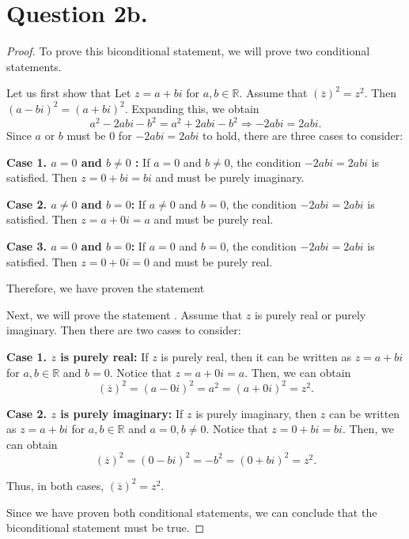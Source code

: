 \documentclass{article}
\begin{document}
\section*{Question 2b.}
\begin{proof}
    To prove this biconditional statement, we will prove two conditional statements.

    \noindent Let us first show that  Let $ z = a + bi $ for $ a, b \in \mathbb{R} $. Assume that $ (\overline{z})^2 = z^2 $. Then $ (a - bi)^2 = (a + bi)^2 $. Expanding this, we obtain
    \[
        a^2 - 2abi - b^2 = a^2 + 2abi - b^2 \Rightarrow -2abi = 2abi.
    \]
    Since $ a $ or $ b $ must be $ 0 $ for $ -2abi = 2abi $ to hold, there are three cases to consider:

    \noindent \textbf{Case 1. $ a = 0 $ and $ b \neq 0 $ :} If $ a = 0 $ and $ b \neq 0 $, the condition $ -2abi = 2abi $ is satisfied. Then $ z = 0 + bi = bi $ and must be purely imaginary.

    \noindent \textbf{Case 2. $ a \neq 0 $ and $ b = 0 $:} If $ a \neq 0 $ and $ b = 0 $, the condition $ -2abi = 2abi $ is satisfied. Then $ z = a + 0i = a $ and must be purely real.

    \noindent \textbf{Case 3. $ a = 0 $ and $ b = 0 $:} If $ a = 0 $ and $ b = 0 $, the condition $ -2abi = 2abi $ is satisfied. Then $ z = 0 + 0i = 0 $ and must be purely real.

    \noindent Therefore, we have proven the statement 

    \noindent Next, we will prove the statement . Assume that $ z $ is purely real or purely imaginary. Then there are two cases to consider:

    \noindent \textbf{Case 1. $ z $ is purely real:} If $ z $ is purely real, then it can be written as $ z = a + bi $ for $ a, b \in \mathbb{R} $ and $ b = 0 $. Notice that $ z = a + 0i = a $. Then, we can obtain
    \[
        (\overline{z})^2 = (a - 0i)^2 = a^2 = (a + 0i)^2 = z^2.
    \]
    
    \noindent \textbf{Case 2. $ z $ is purely imaginary:} If $ z $ is purely imaginary, then $ z $ can be written as $ z = a + bi $ for $ a, b \in \mathbb{R} $ and $ a = 0, b \neq 0 $. Notice that $ z = 0 + bi = bi $. Then, we can obtain
    \[
        (\overline{z})^2 = (0 - bi)^2 = -b^2 = (0 + bi)^2 = z^2.
    \]

    \noindent Thus, in both cases, $ (\overline{z})^2 = z^2 $.

    \noindent Since we have proven both conditional statements, we can conclude that the biconditional statement must be true.
\end{proof}
\end{document}
